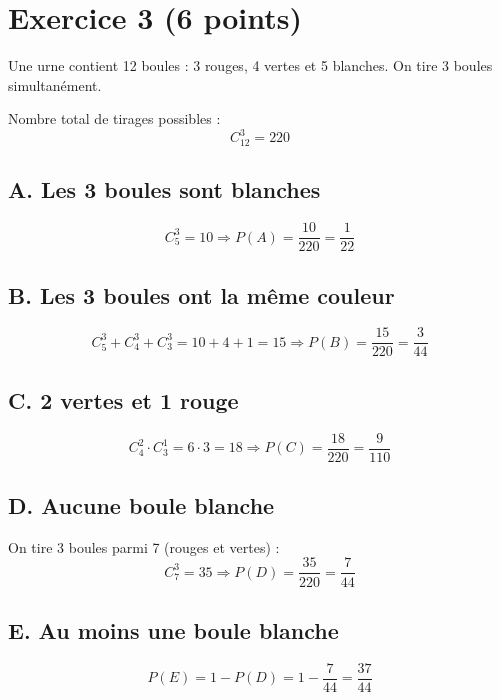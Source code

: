 \documentclass{article}
\newcommand{\Cnk}[2]{C_{#1}^{#2}}
\begin{document}
\section*{Exercice 3 (6 points)}

Une urne contient 12 boules : 3 rouges, 4 vertes et 5 blanches.  
On tire 3 boules simultanément.

Nombre total de tirages possibles :
\[
\Cnk{12}{3} = 220
\]

\subsection*{A. Les 3 boules sont blanches}

\[
\Cnk{5}{3} = 10 \Rightarrow P(A) = \frac{10}{220} = \boxed{\frac{1}{22}}
\]

\subsection*{B. Les 3 boules ont la même couleur}

\[
\Cnk{5}{3} + \Cnk{4}{3} + \Cnk{3}{3} = 10 + 4 + 1 = 15
\Rightarrow P(B) = \frac{15}{220} = \boxed{\frac{3}{44}}
\]

\subsection*{C. 2 vertes et 1 rouge}

\[
\Cnk{4}{2} \cdot \Cnk{3}{1} = 6 \cdot 3 = 18
\Rightarrow P(C) = \frac{18}{220} = \boxed{\frac{9}{110}}
\]

\subsection*{D. Aucune boule blanche}

On tire 3 boules parmi 7 (rouges et vertes) :
\[
\Cnk{7}{3} = 35 \Rightarrow P(D) = \frac{35}{220} = \boxed{\frac{7}{44}}
\]

\subsection*{E. Au moins une boule blanche}

\[
P(E) = 1 - P(D) = 1 - \frac{7}{44} = \boxed{\frac{37}{44}}
\]
\end{document}
